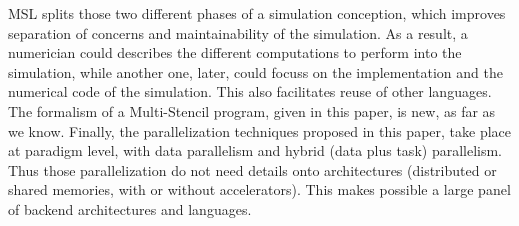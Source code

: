 MSL splits those two different phases of a simulation conception, which improves separation of concerns and maintainability of the simulation. As a result, a numerician could describes the different computations to perform into the simulation, while another one, later, could focuss on the implementation and the numerical code of the simulation. This also facilitates reuse of other languages. The formalism of a Multi-Stencil program, given in this paper, is new, as far as we know. Finally, the parallelization techniques proposed in this paper, take place at paradigm level, with data parallelism and hybrid (data plus task) parallelism. Thus those parallelization do not need details onto architectures (distributed or shared memories, with or without accelerators). This makes possible a large panel of backend architectures and languages.